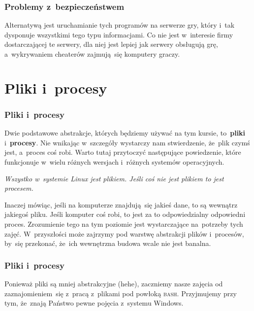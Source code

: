\documentclass[10pt,t]{beamer}
\begin{document}
\begin{frame}
  \frametitle{Problemy z~bezpieczeństwem}


  Alternatywą jest uruchamianie tych programów na serwerze
  gry, który i~tak dysponuje wszystkimi tego typu informacjami. Co nie jest
  w~interesie firmy dostarczającej te serwery, dla niej jest lepiej jak
  serwery obsługują grę, a~wykrywaniem cheaterów zajmują~się komputery
  graczy.

\end{frame}










\section{Pliki i~procesy}



\begin{frame}
  \frametitle{Pliki i~procesy}


  Dwie podstawowe abstrakcje, których będziemy używać na tym kursie,
  to~\textbf{pliki} i~\textbf{procesy}. Nie wnikając w~szczegóły wystarczy
  nam stwierdzenie, że~plik czymś jest, a~proces coś robi. Warto tutaj
  przytoczyć następujące powiedzenie, które funkcjonuje w~wielu różnych
  wersjach i~różnych systemów operacyjnych.

  \textit{Wszystko w~systemie Linux jest plikiem. Jeśli coś nie jest
    plikiem to jest procesem.}

  Inaczej mówiąc, jeśli na komputerze znajdują~się jakieś dane, to są
  wewnątrz jakiegoś pliku. Jeśli komputer coś robi, to jest za to
  odpowiedzialny odpowiedni proces. Zrozumienie tego na tym poziomie jest
  wystarczające na~potrzeby tych zajęć. W~przyszłości może zajrzymy pod
  warstwę abstrakcji plików i~procesów, by~się przekonać, że~ich wewnętrzna
  budowa wcale nie jest banalna.

\end{frame}





\begin{frame}
  \frametitle{Pliki i~procesy}


  Ponieważ pliki są mniej abstrakcyjne (hehe), zaczniemy nasze zajęcia od
  zaznajomieniem~się z~pracą z~plikami pod powłoką \textsc{bash}.
  Przyjmujemy przy tym, że~znają Państwo pewne pojęcia z~systemu Windows.

\end{frame}
\end{document}
